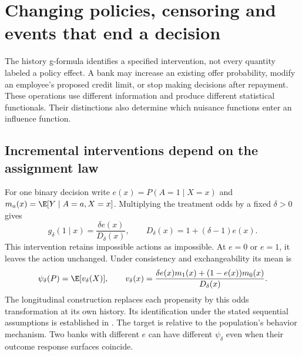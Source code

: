 \chapter{Changing policies, censoring and events that end a decision}
\label{r3:policy-targets}
The history g-formula identifies a specified intervention, not every
quantity labeled a policy effect. A bank may increase an existing offer
probability, modify an employee's proposed credit limit, or stop making
decisions after repayment. These operations use different information
and produce different statistical functionals. Their distinctions also
determine which nuisance functions enter an influence function.

\section{Incremental interventions depend on the assignment law}
\label{r3:incremental}
For one binary decision write $e(x)=P(A=1\mid X=x)$ and
$m_a(x)=\E[Y\mid A=a,X=x]$. Multiplying the treatment odds by a
fixed $\delta>0$ gives
\[
 g_\delta(1\mid x)=\frac{\delta e(x)}{D_\delta(x)},\qquad
 D_\delta(x)=1+(\delta-1)e(x).
\]
This intervention retains impossible actions as impossible. At $e=0$
or $e=1$, it leaves the action unchanged. Under consistency and
exchangeability its mean is
\begin{equation}
 \psi_\delta(P)=\E[v_\delta(X)],\qquad
 v_\delta(x)=\frac{\delta e(x)m_1(x)+(1-e(x))m_0(x)}{D_\delta(x)}.
 \label{r3:incremental-target}
\end{equation}
The longitudinal construction replaces each propensity by this odds
transformation at its own history. Its identification under the stated
sequential assumptions is established in
\citet[Theorem 1 and Corollary 1]{kennedy2019}. The target is relative
to the population's behavior mechanism. Two banks with different $e$
can have different $\psi_\delta$ even when their outcome response
surfaces coincide.

